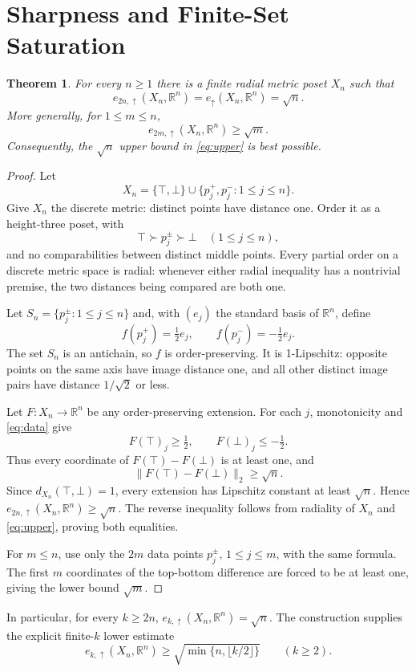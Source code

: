 \documentclass[11pt]{article}
\newtheorem{theorem}{Theorem}
\newcommand{\R}{\mathbb R}
\begin{document}
\section*{Sharpness and Finite-Set Saturation}

\begin{theorem}\label{thm:sharp}
For every $n\geq1$ there is a finite radial metric poset $X_n$ such that
\[
 e_{2n,\uparrow}(X_n,\R^n)
 =e_\uparrow(X_n,\R^n)=\sqrt n.
\]
More generally, for $1\leq m\leq n$,
\[
 e_{2m,\uparrow}(X_n,\R^n)\geq\sqrt m.
\]
Consequently, the $\sqrt n$ upper bound in \eqref{eq:upper} is best possible.
\end{theorem}

\begin{proof}
Let
\[
 X_n=\{\top,\bot\}\cup
     \{p_j^+,p_j^-:1\leq j\leq n\}.
\]
Give $X_n$ the discrete metric: distinct points have distance one.  Order it
as a height-three poset, with
\[
 \top\succ p_j^\pm\succ\bot\quad(1\leq j\leq n),
\]
and no comparabilities between distinct middle points.  Every partial order
on a discrete metric space is radial: whenever either radial inequality has
a nontrivial premise, the two distances being compared are both one.

Let $S_n=\{p_j^\pm:1\leq j\leq n\}$ and, with $(e_j)$ the standard basis of
$\R^n$, define
\[
 f(p_j^+)=\tfrac12e_j,
 \qquad f(p_j^-)=-\tfrac12e_j.
 \tag{2}\label{eq:data}
\]
The set $S_n$ is an antichain, so $f$ is order-preserving.  It is
1-Lipschitz: opposite points on the same axis have image distance one, and
all other distinct image pairs have distance $1/\sqrt2$ or less.

Let $F:X_n\to\R^n$ be any order-preserving extension.  For each $j$,
monotonicity and \eqref{eq:data} give
\[
 F(\top)_j\geq\tfrac12,
 \qquad F(\bot)_j\leq-\tfrac12.
\]
Thus every coordinate of $F(\top)-F(\bot)$ is at least one, and
\[
 \|F(\top)-F(\bot)\|_2\geq\sqrt n.
\]
Since $d_{X_n}(\top,\bot)=1$, every extension has Lipschitz constant at
least $\sqrt n$.  Hence $e_{2n,\uparrow}(X_n,\R^n)\geq\sqrt n$.  The reverse
inequality follows from radiality of $X_n$ and \eqref{eq:upper}, proving both
equalities.

For $m\leq n$, use only the $2m$ data points $p_j^\pm$, $1\leq j\leq m$,
with the same formula.  The first $m$ coordinates of the top-bottom
difference are forced to be at least one, giving the lower bound $\sqrt m$.
\end{proof}

In particular, for every $k\geq2n$,
$e_{k,\uparrow}(X_n,\R^n)=\sqrt n$.  The construction supplies the explicit
finite-$k$ lower estimate
\[
 e_{k,\uparrow}(X_n,\R^n)
 \geq \sqrt{\min\{n,\lfloor k/2\rfloor\}}
 \qquad(k\geq2).
\]
\end{document}
